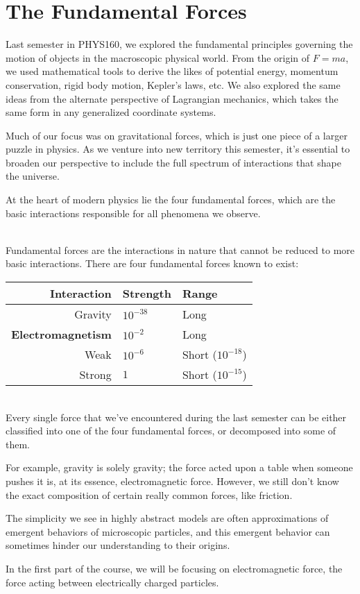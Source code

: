 \section{The Fundamental Forces}
Last semester in PHYS160, we explored the fundamental principles governing the motion of objects in the macroscopic physical world. From the origin of $F=ma$, we used mathematical tools to derive the likes of potential energy, momentum conservation, rigid body motion, Kepler's laws, etc. We also explored the same ideas from the alternate perspective of Lagrangian mechanics, which takes the same form in any generalized coordinate systems.\par
Much of our focus was on gravitational forces, which is just one piece of a larger puzzle in physics. As we venture into new territory this semester, it's essential to broaden our perspective to include the full spectrum of interactions that shape the universe.\par
At the heart of modern physics lie the four fundamental forces, which are the basic interactions responsible for all phenomena we observe.
\begin{definition}
    \ \\Fundamental forces are the interactions in nature that cannot be reduced to more basic interactions. There are four fundamental forces known to exist:\vspace{5pt}
    \begin{center}
        \begin{tabular}{rll}
            \toprule
            \bfseries Interaction & \bfseries Strength & \bfseries Range\\
            \midrule
            Gravity & $10^{-38}$ & Long\\
            \bfseries Electromagnetism & $10^{-2}$ & Long\\
            Weak & $10^{-6}$ & Short ($10^{-18}$)\\
            Strong & $1$ & Short ($10^{-15}$)\\
            \bottomrule
        \end{tabular}
    \end{center}
\end{definition}
\vspace{-12pt}
\begin{remark}
    \ \\Every single force that we've encountered during the last semester can be either classified into one of the four fundamental forces, or decomposed into some of them.\par For example, gravity is solely gravity; the force acted upon a table when someone pushes it is, at its essence, electromagnetic force. However, we still don't know the exact composition of certain really common forces, like friction.\par The simplicity we see in highly abstract models are often approximations of emergent behaviors of microscopic particles, and this emergent behavior can sometimes hinder our understanding to their origins.
\end{remark}
In the first part of the course, we will be focusing on electromagnetic force, the force acting between electrically charged particles.

